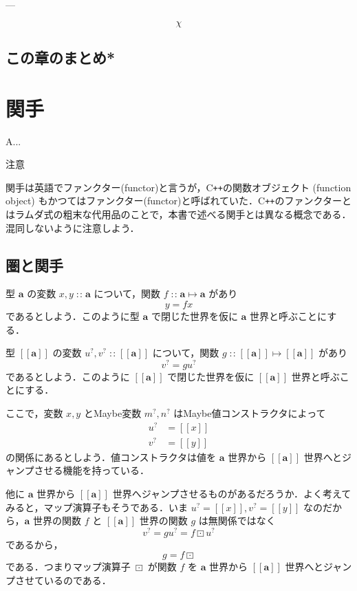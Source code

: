 \documentclass[a4paper]{jsbook}
\def\[{\left[\!\left[}
\def\]{\right]\!\right]}
\newcommand{\programminglanguage}[1]{\textsf{#1}}
\newcommand{\cxx}{\programminglanguage{C}\texttt{++}}
\newenvironment{leader}{\begingroup}{\endgroup}
\newenvironment{caution}{\begin{boxnote}\begin{center}注意\end{center}}{\end{boxnote}}
\newcommand{\mMaybeWith}[1]{\[#1\]}
\newcommand{\mType}[1]{\mathbf{#1}}
\newcommand{\mMaybeType}[1]{\mMaybeWith{\mType{#1}}}
\newcommand{\mMaybe}[1]{{#1}^\text{?}}
\DeclareMathOperator{\mIn}{{:\!:}}
\DeclareMathOperator{\mMapsTo}{\mapsto}
\DeclareMathOperator{\mMapMaybe}{\boxdot}
\newcommand{\mProj}[2]{#1\mMapsTo#2}
\begin{document}
---

$$\chi$$

\section{この章のまとめ*}

\chapter{関手}
\label{ch:functor}

\begin{leader}
A...
\end{leader}

\begin{caution}
関手は英語でファンクター(functor)と言うが，\cxx の関数オブジェクト (function object) もかつてはファンクター(functor)と呼ばれていた．\cxx のファンクターとはラムダ式の粗末な代用品のことで，本書で述べる関手とは異なる概念である．混同しないように注意しよう．
\end{caution}


\section{圏と関手}

型 $\mType{a}$ の変数 $x,y\mIn\mType{a}$ について，関数 $f\mIn\mProj{\mType{a}}{\mType{a}}$ があり
\begin{equation}
y=fx
\end{equation}
であるとしよう．このように型 $\mType{a}$ で閉じた世界を仮に $\mType{a}$ 世界と呼ぶことにする．

型 $\mMaybeType{a}$ の変数 $\mMaybe{u},\mMaybe{v}\mIn\mMaybeType{a}$ について，関数 $g\mIn\mProj{\mMaybeType{a}}{\mMaybeType{a}}$ があり
\begin{equation}
\mMaybe{v}=g\mMaybe{u}
\end{equation}
であるとしよう．このように $\mMaybeType{a}$ で閉じた世界を仮に $\mMaybeType{a}$ 世界と呼ぶことにする．

ここで，変数 $x,y$ とMaybe変数 $\mMaybe{m},\mMaybe{n}$ はMaybe値コンストラクタによって
\begin{align}
\mMaybe{u}&=\mMaybeWith{x}\\
\mMaybe{v}&=\mMaybeWith{y}
\end{align}
の関係にあるとしよう．値コンストラクタは値を $\mType{a}$ 世界から $\mMaybeType{a}$ 世界へとジャンプさせる機能を持っている．

他に $\mType{a}$ 世界から $\mMaybeType{a}$ 世界へジャンプさせるものがあるだろうか．よく考えてみると，マップ演算子もそうである．いま $\mMaybe{u}=\mMaybeWith{x},\mMaybe{v}=\mMaybeWith{y}$ なのだから，$\mType{a}$ 世界の関数 $f$ と $\mMaybeType{a}$ 世界の関数 $g$ は無関係ではなく
\begin{equation}
\mMaybe{v}=g\mMaybe{u}=f\mMapMaybe\mMaybe{u}
\end{equation}
であるから，
\begin{equation}
g=f\mMapMaybe
\end{equation}
である．つまりマップ演算子 $\mMapMaybe$ が関数 $f$ を $\mType{a}$ 世界から $\mMaybeType{a}$ 世界へとジャンプさせているのである．
\end{document}
